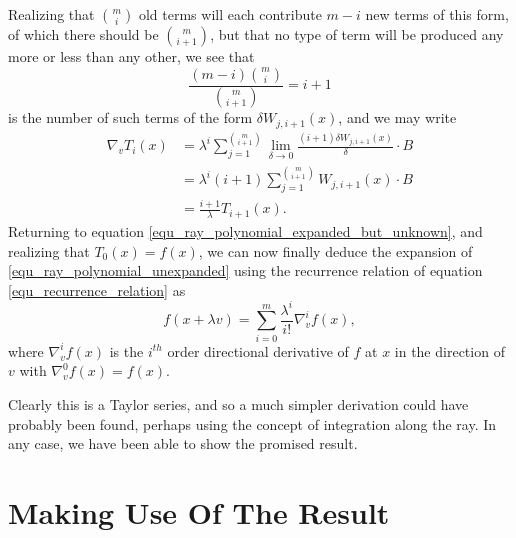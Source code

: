 \documentclass{birkjour}
\theoremstyle{definition}
\theoremstyle{remark}
\numberwithin{equation}{section}
\begin{document}
Realizing that $\binom{m}{i}$ old terms will each contribute $m-i$ new terms of
this form, of which there should be $\binom{m}{i+1}$, but that no type of term
will be produced any more or less than any other, we see that
\begin{equation*}
\frac{(m-i)\binom{m}{i}}{\binom{m}{i+1}}=i+1
\end{equation*}
is the number of such terms of the form $\delta W_{j,i+1}(x)$, and we may write
\begin{align}
\nabla_v T_i(x) &= \lambda^i\sum_{j=1}^{\binom{m}{i+1}}\lim_{\delta\to 0}
\frac{(i+1)\delta W_{j,i+1}(x)}{\delta}\cdot B\nonumber \\
 &= \lambda^i(i+1)\sum_{j=1}^{\binom{m}{i+1}} W_{j,i+1}(x)\cdot B\nonumber \\
 &= \frac{i+1}{\lambda}T_{i+1}(x).\label{equ_recurrence_relation}
\end{align}
Returning to equation \eqref{equ_ray_polynomial_expanded_but_unknown},
and realizing that $T_0(x)=f(x)$, we can now finally deduce the expansion of
\eqref{equ_ray_polynomial_unexpanded} using the recurrence relation
of equation \eqref{equ_recurrence_relation} as
\begin{equation}\label{equ_result}
f(x+\lambda v) = \sum_{i=0}^m\frac{\lambda^i}{i!}\nabla_v^i f(x),
\end{equation}
where $\nabla_v^i f(x)$ is the $i^{th}$ order directional derivative of $f$ at $x$
in the direction of $v$ with $\nabla_v^0 f(x)=f(x)$.

Clearly this is a Taylor series, and so a much simpler
derivation could have probably been found, perhaps using the
concept of integration along the ray.  In any case, we have been
able to show the promised result.

\section{Making Use Of The Result}
\end{document}
